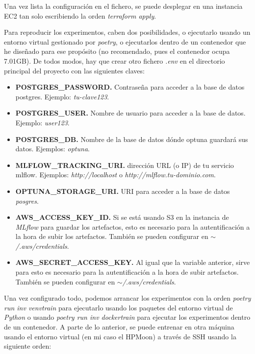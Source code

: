 Una vez lista la configuración en el fichero, se puede desplegar en una instancia EC2 tan solo escribiendo la orden \textit{terraform apply}.\newline

Para reproducir los experimentos, caben dos posibilidades, o ejecutarlo usando un entorno virtual gestionado por \textit{poetry}, o ejecutarlos dentro de un contenedor que he diseñado para ese propósito (no recomendado, pues el contenedor ocupa 7.01GB). De todos modos, hay que crear otro fichero \textit{.env} en el directorio principal del proyecto con las siguientes claves:

\begin{itemize}
	\item \textbf{POSTGRES\_PASSWORD.} Contraseña para acceder a la base de datos postgres. Ejemplo: \textit{tu-clave123}.
	 \item \textbf{POSTGRES\_USER.} Nombre de usuario para acceder a la base de datos. Ejemplo: \textit{user123}.
	 \item \textbf{POSTGRES\_DB.} Nombre de la base de datos dónde optuna guardará sus datos. Ejemplos: \textit{optuna}.
	 \item \textbf{MLFLOW\_TRACKING\_URI.} dirección URL (o IP) de tu servicio mlflow. Ejemplos: \textit{http://localhost} o \textit{http://mlflow.tu-dominio.com}.
	 \item \textbf{OPTUNA\_STORAGE\_URI.} URI para acceder a la base de datos \textit{posgres}.
	 \item \textbf{AWS\_ACCESS\_KEY\_ID.} Si se está usando S3 en la instancia de \textit{MLflow} para guardar los artefactos, esto es necesario para la autentificación a la hora de subir los artefactos. También se pueden configurar en \textit{$\sim$/.aws/credentials}.
	 \item \textbf{AWS\_SECRET\_ACCESS\_KEY.} Al igual que la variable anterior, sirve para esto es necesario para la autentificación a la hora de subir artefactos. También se pueden configurar en \textit{$\sim$/.aws/credentials}.
\end{itemize}

Una vez configurado todo, podemos arrancar los experimentos con la orden \textit{poetry run inv venvtrain} para ejecutarlo usando los paquetes del entorno virtual de \textit{Python} o usando \textit{poetry run inv dockertrain} para ejecutar los experimentos dentro de un contenedor. A parte de lo anterior, se puede entrenar en otra máquina usando el entorno virtual (en mi caso el HPMoon) a través de SSH usando la siguiente orden:

